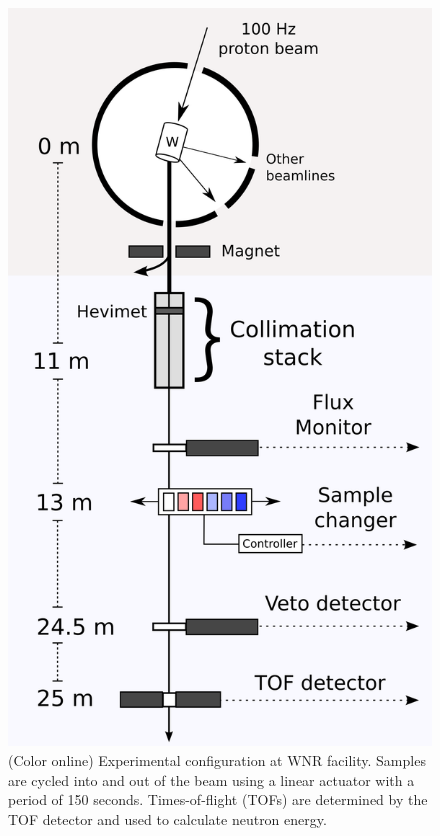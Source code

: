 \documentclass[twocolumn,secnumarabic,amssymb, nobibnotes, aps, prl,
superscriptaddress, nobalancelastpage]{revtex4}
\begin{document}
\begin{figure}
    \includegraphics[scale=0.6]{figures/ExperimentalSetup.png}
    \caption{(Color online) Experimental configuration at WNR facility.
        Samples are cycled into and out of the beam
        using a linear actuator with a period of 150 seconds. Times-of-flight (TOFs) are
    determined by the TOF detector and used to calculate neutron energy.}
    \label{ExperimentalApparatus}
\end{figure}
\end{document}
